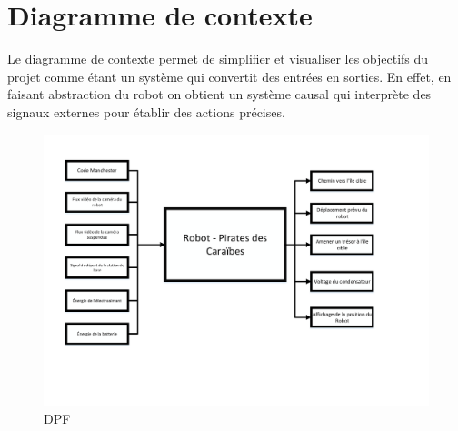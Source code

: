 \chapter{Diagramme de contexte}

Le diagramme de contexte permet de simplifier et visualiser les objectifs du projet comme étant un système qui convertit des entrées en sorties.
En effet, en faisant abstraction du robot on obtient un système causal qui interprète des signaux externes pour établir des actions précises.

\begin{figure}[h]
  \centering
  \includegraphics[scale=0.6, trim = 5mm 15mm 10mm 5mm, clip]{resources/diag_cont.pdf}
  \caption{DPF}
\end{figure}
